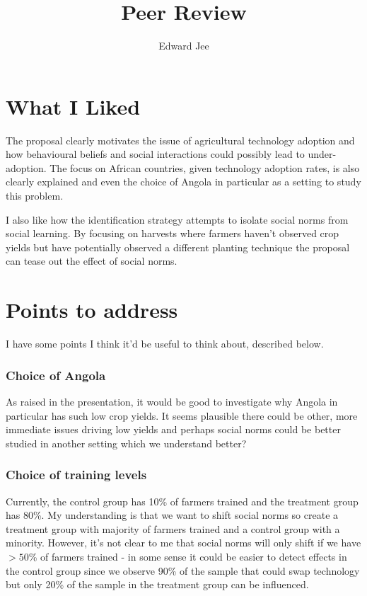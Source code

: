 \documentclass{article}
\title{Peer Review}
\author{Edward Jee}
\begin{document}
\maketitle



\section*{What I Liked}


The proposal clearly motivates the issue of agricultural technology adoption and 
how behavioural beliefs and social interactions could possibly lead to 
under-adoption. The focus on African countries, given technology adoption rates, 
is also clearly explained and even the choice of Angola in particular as a 
setting to study this problem.


I also like how the identification strategy attempts to isolate social norms 
from social learning. By focusing on harvests where farmers haven't observed 
crop yields but have potentially observed a different planting technique the 
proposal can tease out the effect of social norms. 

\section*{Points to address}


I have some points I think it'd be useful to think about, described below.


\subsubsection*{Choice of Angola}
As raised in the presentation, it would be good to investigate why Angola in 
particular has such low crop yields. It seems plausible there could be other, 
more immediate issues driving low yields and perhaps social norms could be 
better studied in another setting which we understand better?



\subsubsection*{Choice of training levels}

Currently, the control group has 10\% of farmers trained and the treatment group 
has 80\%. My understanding is that we want to shift social norms so create a 
treatment group with majority of farmers trained and a control group with a 
minority. However, it's not clear to me that social norms will only shift if we 
have $>50$\% of farmers trained - in some sense it could be easier to detect 
effects in the control group since we observe 90\% of the sample that could 
swap technology but only 20\% of the sample in the treatment group can be 
influenced.
\end{document}
